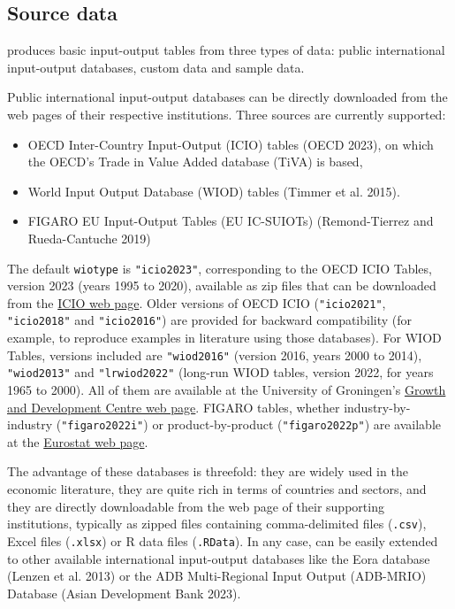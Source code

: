 \hypertarget{source-data}{%
\subsection{Source data}\label{source-data}}

 produces basic input-output tables from three types
of data: public international input-output databases, custom data and
sample data.

Public international input-output databases can be directly downloaded from the
web pages of their respective institutions. Three sources are currently
supported:

\begin{itemize}
\tightlist
\item
  OECD Inter-Country Input-Output (ICIO) tables (OECD 2023), on which
  the OECD's Trade in Value Added database (TiVA) is based,
\item
  World Input Output Database (WIOD) tables (Timmer et al. 2015).
\item
  FIGARO EU Input-Output Tables (EU IC-SUIOTs) (Remond-Tierrez and Rueda-Cantuche 2019)
\end{itemize}

The default \texttt{wiotype} is \texttt{"icio2023"}, corresponding to the OECD ICIO Tables,
version 2023 (years 1995 to 2020), available as zip files that can be downloaded
from the \href{https://www.oecd.org/sti/ind/inter-country-input-output-tables.htm}{ICIO web
page}. Older
versions of OECD ICIO (\texttt{"icio2021"}, \texttt{"icio2018"} and \texttt{"icio2016"}) are provided
for backward compatibility (for example, to reproduce examples in literature
using those databases). For WIOD Tables, versions included are \texttt{"wiod2016"}
(version 2016, years 2000 to 2014), \texttt{"wiod2013"} and \texttt{"lrwiod2022"} (long-run
WIOD tables, version 2022, for years 1965 to 2000). All of them are available at
the University of Groningen's \href{https://www.rug.nl/ggdc/valuechain/wiod/}{Growth and Development Centre web
page}. FIGARO tables, whether
industry-by-industry (\texttt{"figaro2022i"}) or product-by-product (\texttt{"figaro2022p"})
are available at the \href{https://ec.europa.eu/eurostat/web/esa-supply-use-input-tables/database}{Eurostat web
page}.

The advantage of these databases is threefold: they are widely used in the
economic literature, they are quite rich in terms of countries and sectors, and
they are directly downloadable from the web page of their supporting
institutions, typically as zipped files containing comma-delimited files
(\texttt{.csv}), Excel files (\texttt{.xlsx}) or R data files (\texttt{.RData}). In any case,
 can be easily extended to other available international
input-output databases like the Eora database (Lenzen et al. 2013) or the ADB
Multi-Regional Input Output (ADB-MRIO) Database
(Asian Development Bank 2023).

